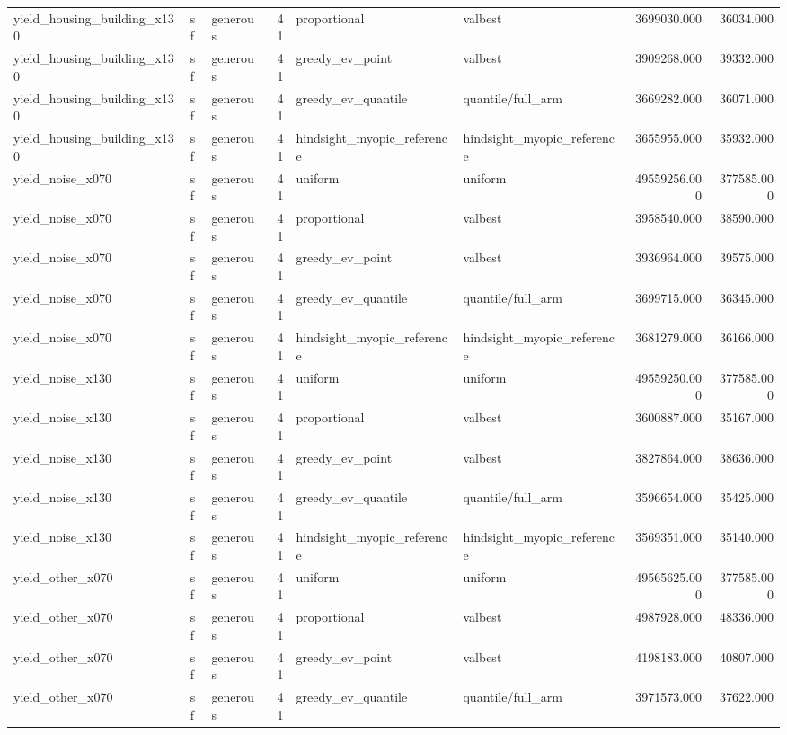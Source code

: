 \begin{tabular}{lllrllrr}
yield\_housing\_building\_x130 & sf & generous & 41 & proportional & valbest & 3699030.000 & 36034.000 \\
yield\_housing\_building\_x130 & sf & generous & 41 & greedy\_ev\_point & valbest & 3909268.000 & 39332.000 \\
yield\_housing\_building\_x130 & sf & generous & 41 & greedy\_ev\_quantile & quantile/full\_arm & 3669282.000 & 36071.000 \\
yield\_housing\_building\_x130 & sf & generous & 41 & hindsight\_myopic\_reference & hindsight\_myopic\_reference & 3655955.000 & 35932.000 \\
yield\_noise\_x070 & sf & generous & 41 & uniform & uniform & 49559256.000 & 377585.000 \\
yield\_noise\_x070 & sf & generous & 41 & proportional & valbest & 3958540.000 & 38590.000 \\
yield\_noise\_x070 & sf & generous & 41 & greedy\_ev\_point & valbest & 3936964.000 & 39575.000 \\
yield\_noise\_x070 & sf & generous & 41 & greedy\_ev\_quantile & quantile/full\_arm & 3699715.000 & 36345.000 \\
yield\_noise\_x070 & sf & generous & 41 & hindsight\_myopic\_reference & hindsight\_myopic\_reference & 3681279.000 & 36166.000 \\
yield\_noise\_x130 & sf & generous & 41 & uniform & uniform & 49559250.000 & 377585.000 \\
yield\_noise\_x130 & sf & generous & 41 & proportional & valbest & 3600887.000 & 35167.000 \\
yield\_noise\_x130 & sf & generous & 41 & greedy\_ev\_point & valbest & 3827864.000 & 38636.000 \\
yield\_noise\_x130 & sf & generous & 41 & greedy\_ev\_quantile & quantile/full\_arm & 3596654.000 & 35425.000 \\
yield\_noise\_x130 & sf & generous & 41 & hindsight\_myopic\_reference & hindsight\_myopic\_reference & 3569351.000 & 35140.000 \\
yield\_other\_x070 & sf & generous & 41 & uniform & uniform & 49565625.000 & 377585.000 \\
yield\_other\_x070 & sf & generous & 41 & proportional & valbest & 4987928.000 & 48336.000 \\
yield\_other\_x070 & sf & generous & 41 & greedy\_ev\_point & valbest & 4198183.000 & 40807.000 \\
yield\_other\_x070 & sf & generous & 41 & greedy\_ev\_quantile & quantile/full\_arm & 3971573.000 & 37622.000 \\

\end{tabular}
